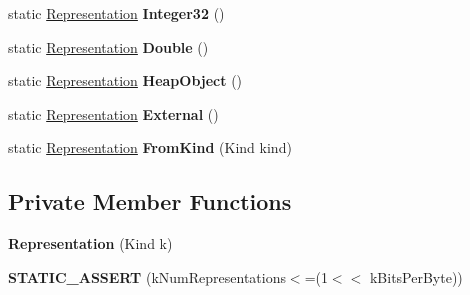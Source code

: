 \begin{DoxyCompactItemize}
\item 
static \hyperlink{classv8_1_1internal_1_1_representation}{Representation} {\bfseries Integer32} ()\hypertarget{classv8_1_1internal_1_1_representation_a8ebdb3d2ad2e45a01e769410bd620a3f}{}\label{classv8_1_1internal_1_1_representation_a8ebdb3d2ad2e45a01e769410bd620a3f}

\item 
static \hyperlink{classv8_1_1internal_1_1_representation}{Representation} {\bfseries Double} ()\hypertarget{classv8_1_1internal_1_1_representation_a2601764cfa13d6944d909d8c26fad1f3}{}\label{classv8_1_1internal_1_1_representation_a2601764cfa13d6944d909d8c26fad1f3}

\item 
static \hyperlink{classv8_1_1internal_1_1_representation}{Representation} {\bfseries Heap\+Object} ()\hypertarget{classv8_1_1internal_1_1_representation_aa620b108401d1d5396ca2cf81e85614f}{}\label{classv8_1_1internal_1_1_representation_aa620b108401d1d5396ca2cf81e85614f}

\item 
static \hyperlink{classv8_1_1internal_1_1_representation}{Representation} {\bfseries External} ()\hypertarget{classv8_1_1internal_1_1_representation_a58aecc078db837eced69a71cd9716360}{}\label{classv8_1_1internal_1_1_representation_a58aecc078db837eced69a71cd9716360}

\item 
static \hyperlink{classv8_1_1internal_1_1_representation}{Representation} {\bfseries From\+Kind} (Kind kind)\hypertarget{classv8_1_1internal_1_1_representation_ae358bed6c0e672849eed8ae0dd4b1a7a}{}\label{classv8_1_1internal_1_1_representation_ae358bed6c0e672849eed8ae0dd4b1a7a}

\end{DoxyCompactItemize}
\subsection*{Private Member Functions}
\begin{DoxyCompactItemize}
\item 
{\bfseries Representation} (Kind k)\hypertarget{classv8_1_1internal_1_1_representation_abaef99a9456e8483a633fe11f44120a1}{}\label{classv8_1_1internal_1_1_representation_abaef99a9456e8483a633fe11f44120a1}

\item 
{\bfseries S\+T\+A\+T\+I\+C\+\_\+\+A\+S\+S\+E\+RT} (k\+Num\+Representations$<$=(1$<$$<$ k\+Bits\+Per\+Byte))\hypertarget{classv8_1_1internal_1_1_representation_a4b4037e19640a7eda6b6de1b0aa431d5}{}\label{classv8_1_1internal_1_1_representation_a4b4037e19640a7eda6b6de1b0aa431d5}

\end{DoxyCompactItemize}
